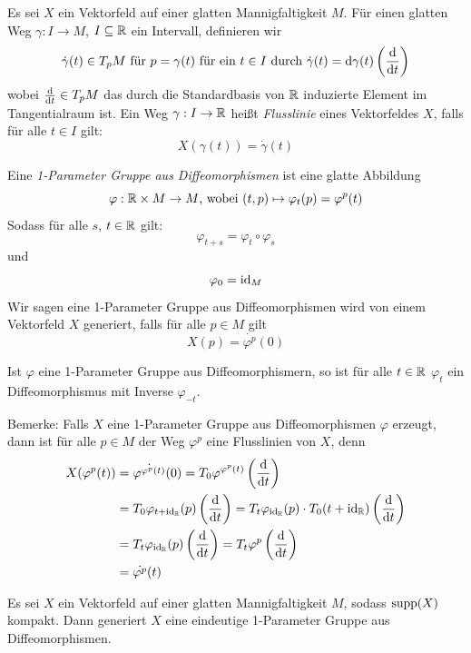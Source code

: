 \begin{definition}
    Es sei $X$ ein Vektorfeld auf einer glatten Mannigfaltigkeit $M$. Für einen
    glatten Weg $\gamma: I \to M$, $I \subseteq { \mathbb R }$ ein Intervall, 
    definieren wir
    \[ \dot{\gamma}(t) \in T_pM \text{ für } p = \gamma(t) \text{ für ein } t \in I \text{ durch } 
    \dot{\gamma}(t) = { \operatorname{d} } \gamma (t) \left({ \frac{{ \operatorname{d} } }{{ \operatorname{d} } t} }\right) \]
    wobei ${ \frac{{ \operatorname{d} } }{{ \operatorname{d} } t} } \in T_pM$ das durch die Standardbasis von ${ \mathbb R }$
    induzierte Element im Tangentialraum ist.
    Ein Weg $\gamma: I \to { \mathbb R }$ heißt \textit{Flusslinie} eines Vektorfeldes $X$,
    falls für alle $t \in I$ gilt:
    \[ X(\gamma(t)) = \dot{\gamma}(t) \]
\end{definition}

\begin{definition}
    Eine \textit{1-Parameter Gruppe aus Diffeomorphismen} ist eine glatte 
    Abbildung
    \[ \varphi: { \mathbb R } \times M \to M \text{, wobei } (t, p) \mapsto \varphi_t(p) = \varphi^p(t) \]
    Sodass für alle $s$, $t \in { \mathbb R }$ gilt:
    \[ \varphi_{t + s} = \varphi_t \circ \varphi_s \]
    und 
    \[ \varphi_0 = { \operatorname{id} }_M \]
    Wir sagen eine 1-Parameter Gruppe aus Diffeomorphismen wird von einem
    Vektorfeld $X$ generiert, falls für alle $p \in M$ gilt
    \[ X(p) = \dot{\varphi^p}(0) \]
\end{definition}

Ist $\varphi$ eine 1-Parameter Gruppe aus Diffeomorphismern, so ist für alle 
$t \in { \mathbb R }$ $\varphi_t$ ein Diffeomorphismus mit Inverse $\varphi_{-t}$.

Bemerke: Falls $X$ eine 1-Parameter Gruppe aus Diffeomorphismen $\varphi$ erzeugt,
dann ist für alle $p \in M$ der Weg $\varphi^p$ eine Flusslinien von $X$, denn
\begin{align*}
    X(\varphi^p(t)) 
    & = \dot{\varphi^{\varphi^p(t)}}(0)
    = T_0 \varphi^{\varphi^p(t)} \left({ \frac{{ \operatorname{d} } }{{ \operatorname{d} } t} }\right) \\
    & = T_0 \varphi_{t + { \operatorname{id} }_{{ \mathbb R }}}(p) \left({ \frac{{ \operatorname{d} } }{{ \operatorname{d} } t} }\right)
    = T_t \varphi_{{ \operatorname{id} }_{{ \mathbb R }}}(p) \cdot T_0 (t + { \operatorname{id} }_{{ \mathbb R }}) \left({ \frac{{ \operatorname{d} } }{{ \operatorname{d} } t} }\right) \\
    & = T_t \varphi_{{ \operatorname{id} }_{{ \mathbb R }}}(p) \left({ \frac{{ \operatorname{d} } }{{ \operatorname{d} } t} }\right)
    = T_t \varphi^p \left({ \frac{{ \operatorname{d} } }{{ \operatorname{d} } t} }\right) \\
    & = \dot{\varphi^p}(t)
\end{align*}

\begin{lemma}
    \label{lemma:generierende vektorfelder}
    Es sei $X$ ein Vektorfeld auf einer glatten Mannigfaltigkeit $M$, sodass
    ${ \operatorname{supp} }(X)$ kompakt. Dann generiert $X$ eine eindeutige 
    1-Parameter Gruppe aus Diffeomorphismen.
\end{lemma}

